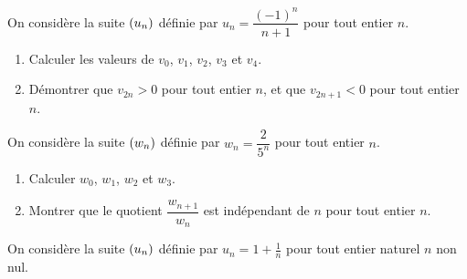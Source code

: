 \documentclass[a4paper,11pt]{article}
\begin{document}
\newpage


\medskip

On considère la suite $\suiten$ définie par $u_n=\dfrac{(-1)^n}{n+1}$ pour tout entier $n$.

\begin{enumerate}[itemsep=0pt]
	\item Calculer les valeurs de $v_0$, $v_1$, $v_2$, $v_3$ et $v_4$.
	\item Démontrer que $v_{2n}>0$ pour tout entier $n$, et que $v_{2n+1}<0$ pour tout entier $n$.
\end{enumerate}

\medskip


\medskip

On considère la suite $\suiten[w]$ définie par $w_n = \dfrac{2}{5^n}$ pour tout entier $n$.

\begin{enumerate}[itemsep=0pt]
	\item Calculer $w_0$, $w_1$, $w_2$ et $w_3$.
	\item Montrer que le quotient $\dfrac{w_{n+1}}{w_n}$ est indépendant de $n$ pour tout entier $n$.
\end{enumerate}

\medskip


\medskip

On considère la suite $\suiten$ définie par $u_n = 1 + \frac{1}{n}$ pour tout entier naturel $n$ non nul.
\end{document}
